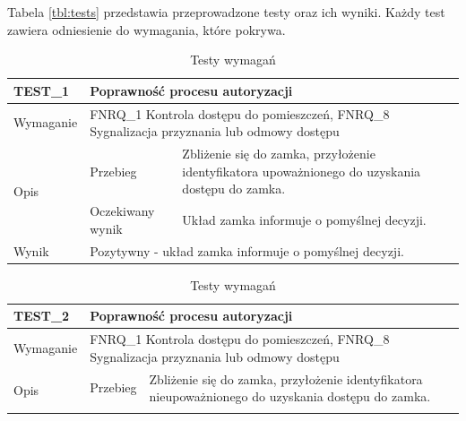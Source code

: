         Tabela \ref{tbl:tests} przedstawia przeprowadzone testy oraz ich wyniki. Każdy test zawiera odniesienie do wymagania, które pokrywa.

        \begin{table}[h!]
            \caption{Testy wymagań}
            \centering
            \begin{subtable}[c]{\textwidth}
                \centering
                    \begin{tabular}{p{2cm}|p{}|p{}}
                    TEST\_1               & \multicolumn{2}{l}{\textbf{Poprawność procesu autoryzacji}} \\ \hline
                    Wymaganie             & \multicolumn{2}{p{12cm}}{FNRQ\_1 Kontrola dostępu do pomieszczeń, FNRQ\_8 Sygnalizacja przyznania lub odmowy dostępu} \\ \hline
                    \multirow{2}{*}{Opis} & Przebieg           & Zbliżenie się do zamka, przyłożenie identyfikatora upoważnionego do uzyskania dostępu do zamka. \\ \cline{2-3}
                                          & Oczekiwany wynik   & Układ zamka informuje o pomyślnej decyzji.                                                 \\ \hline
                    Wynik                 & \multicolumn{2}{p{12cm}}{Pozytywny - układ zamka informuje o pomyślnej decyzji.}                                                                                  \\
                    \end{tabular}%
                \label{tbl:test1}
                \vspace{10mm}
            \end{subtable}
        \quad%
            \begin{subtable}[c]{\textwidth}
                \centering
                    \begin{tabular}{p{2cm}|p{}|p{}}
                    TEST\_2               & \multicolumn{2}{l}{\textbf{Poprawność procesu autoryzacji}}                                                            \\ \hline
                    Wymaganie             & \multicolumn{2}{p{12cm}}{FNRQ\_1 Kontrola dostępu do pomieszczeń, FNRQ\_8 Sygnalizacja przyznania lub odmowy dostępu} \\ \hline
                    \multirow{2}{*}{Opis} & Przebieg           & Zbliżenie się do zamka, przyłożenie identyfikatora nieupoważnionego do uzyskania dostępu do zamka. \\ \cline{2-3}

\end{tabular}
\end{subtable}
\end{table}
